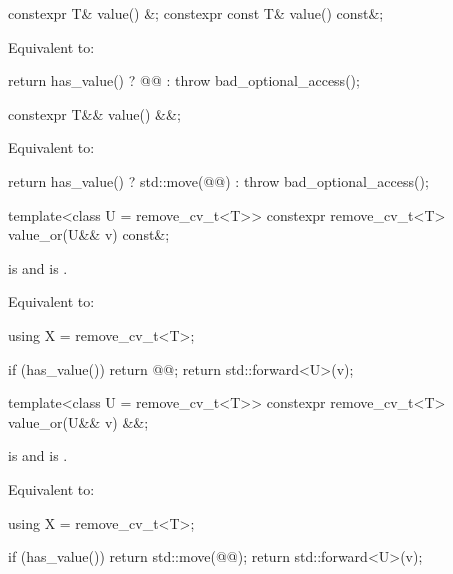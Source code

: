%
\begin{itemdecl}
constexpr T& value() &;
constexpr const T& value() const&;
\end{itemdecl}

\begin{itemdescr}
\pnum
\effects
Equivalent to:
\begin{codeblock}
return has_value() ? @@ : throw bad_optional_access();
\end{codeblock}
\end{itemdescr}

%
\begin{itemdecl}
constexpr T&& value() &&;
\end{itemdecl}

\begin{itemdescr}
\pnum
\effects
Equivalent to:
\begin{codeblock}
return has_value() ? std::move(@@) : throw bad_optional_access();
\end{codeblock}
\end{itemdescr}

%
\begin{itemdecl}
template<class U = remove_cv_t<T>>
  constexpr remove_cv_t<T> value_or(U&& v) const&;
\end{itemdecl}

\begin{itemdescr}
\pnum
\mandates
{} is  and  is .

\pnum
\effects
Equivalent to:
\begin{codeblock}
using X = remove_cv_t<T>;

if (has_value())
  return @@;
return std::forward<U>(v);
\end{codeblock}
\end{itemdescr}

%
\begin{itemdecl}
template<class U = remove_cv_t<T>>
  constexpr remove_cv_t<T> value_or(U&& v) &&;
\end{itemdecl}

\begin{itemdescr}
\pnum
\mandates
{} is  and  is .

\pnum
\effects
Equivalent to:
\begin{codeblock}
using X = remove_cv_t<T>;

if (has_value()) {
  return std::move(@@);
}
return std::forward<U>(v);
\end{codeblock}
\end{itemdescr}

